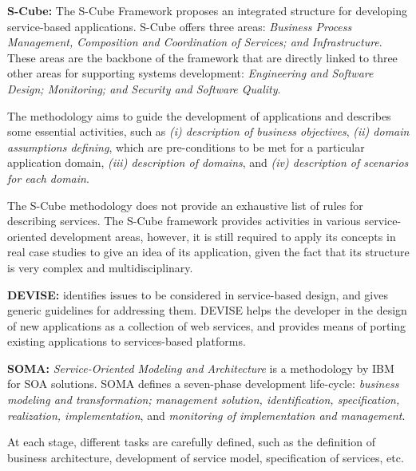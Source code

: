 \bigskip

\textbf{S-Cube:} The S-Cube Framework \cite{scube2010book} proposes an
integrated structure for developing service-based applications. S-Cube offers
three areas: \textit{Business Process Management, Composition and Coordination
of Services; and Infrastructure}. These areas are the backbone of the framework
that are directly linked to three other areas for supporting systems
development: \textit{Engineering and Software Design; Monitoring; and Security
and Software Quality}. 

The methodology aims to guide the development of applications and describes
some essential activities, such as \textit{(i) description of business objectives},
\textit{(ii) domain assumptions defining}, which are
pre-conditions to be met for a particular application domain, \textit{(iii)
description of domains}, and \textit{(iv) description of scenarios for
each domain}.

The S-Cube methodology does not provide an exhaustive list of rules for
describing services. The S-Cube framework provides activities in various
service-oriented development areas, however, it is still required to apply its
concepts in real case studies to give an idea of its application, given the fact
that its structure is very complex and multidisciplinary.


\bigskip

\textbf{DEVISE:}  \cite{DEVISE} identifies issues to
be considered in service-based design, and gives generic guidelines for
addressing them. DEVISE helps the developer in the design of new applications
as a collection of web services, and provides means of porting existing
applications to services-based platforms.


\bigskip

\textbf{SOMA:} \textit{Service-Oriented Modeling and Architecture} \cite{soma}
is a methodology by IBM for SOA solutions. SOMA defines a seven-phase
development life-cycle: \textit{business modeling and transformation; management
solution, identification, specification, realization, implementation}, and
\textit{monitoring of implementation and management}.

At each stage, different tasks are carefully defined,
such as the definition of business architecture, development of service model,
specification of services, etc. 

